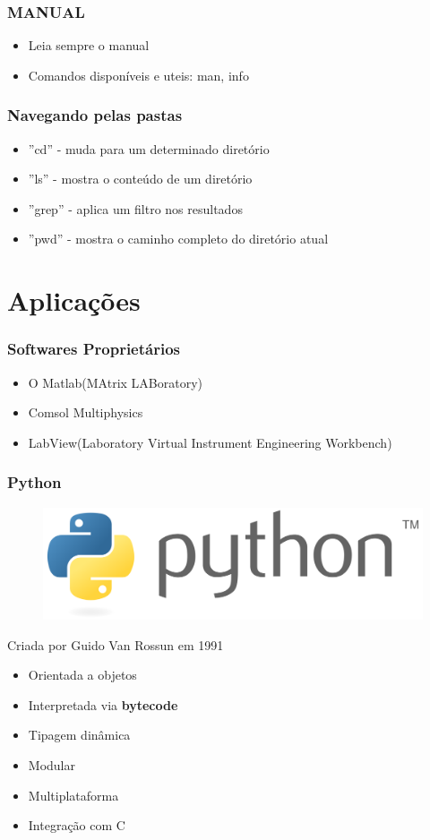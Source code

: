 \documentclass{beamer}
\begin{document}
\begin{frame}
    \frametitle{MANUAL}
    
    \begin{itemize}
        \item Leia sempre o manual
        \item Comandos disponíveis e uteis: man, info
    \end{itemize}

\end{frame}

\begin{frame}
    \frametitle{Navegando pelas pastas}

    \begin{itemize}
        \item ''cd'' - muda para um determinado diretório
        \item ''ls'' - mostra o conteúdo de um diretório
        \item ''grep'' - aplica um filtro nos resultados
        \item ''pwd'' - mostra o caminho completo do diretório atual
    \end{itemize}
\end{frame}


\section{Aplicações}

\begin{frame}

    \frametitle{Softwares Proprietários}
    \begin{itemize}
    \item O Matlab(MAtrix LABoratory)
    \item Comsol Multiphysics
    \item LabView(Laboratory Virtual Instrument Engineering Workbench)
    \end{itemize}
\end{frame}

\begin{frame}
    \frametitle{Python}
    \begin{figure}
        \includegraphics[width=.3\linewidth]{pylogo.png}
    \end{figure}   
    Criada por Guido Van Rossun em 1991
    \begin{itemize}
        \item Orientada a objetos
        \item Interpretada via \textbf{bytecode}
        \item Tipagem dinâmica
        \item Modular
        \item Multiplataforma
        \item Integração com C
    \end{itemize}
\end{frame}
\end{document}

